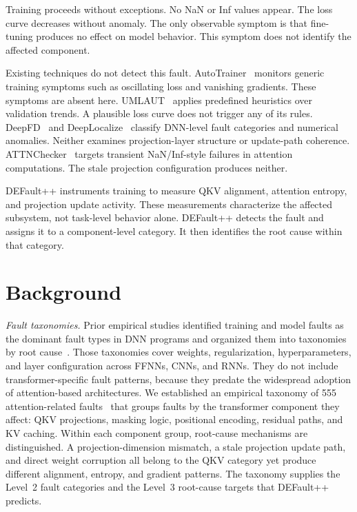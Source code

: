 Training proceeds without exceptions. No NaN or Inf values appear. The loss curve decreases without anomaly. The only observable symptom is that fine-tuning produces no effect on model behavior. This symptom does not identify the affected component.

Existing techniques do not detect this fault. AutoTrainer~\cite{autotrainer} monitors generic training symptoms such as oscillating loss and vanishing gradients. These symptoms are absent here. UMLAUT~\cite{umlaut} applies predefined heuristics over validation trends. A plausible loss curve does not trigger any of its rules. DeepFD~\cite{deepfd} and DeepLocalize~\cite{deeplocalize} classify DNN-level fault categories and numerical anomalies. Neither examines projection-layer structure or update-path coherence. ATTNChecker~\cite{liang2025attnchecker} targets transient NaN/Inf-style failures in attention computations. The stale projection configuration produces neither.

DEFault++ instruments training to measure QKV alignment, attention entropy, and projection update activity. These measurements characterize the affected subsystem, not task-level behavior alone. DEFault++ detects the fault and assigns it to a component-level category. It then identifies the root cause within that category.

\section{Background}
\label{sec:defaultpp_background}

\textit{Fault taxonomies.} Prior empirical studies identified training and model faults as the dominant fault types in DNN programs and organized them into taxonomies by root cause~\cite{faulttaxonomy,dlbugcharacterstics}. Those taxonomies cover weights, regularization, hyperparameters, and layer configuration across FFNNs, CNNs, and RNNs. They do not include transformer-specific fault patterns, because they predate the widespread adoption of attention-based architectures. We established an empirical taxonomy of 555 attention-related faults~\cite{attention_taxonomy} that groups faults by the transformer component they affect: QKV projections, masking logic, positional encoding, residual paths, and KV caching. Within each component group, root-cause mechanisms are distinguished. A projection-dimension mismatch, a stale projection update path, and direct weight corruption all belong to the QKV category yet produce different alignment, entropy, and gradient patterns. The taxonomy supplies the Level~2 fault categories and the Level~3 root-cause targets that DEFault++ predicts.

